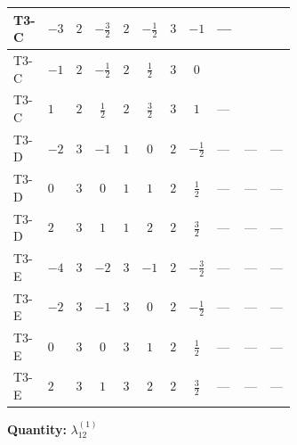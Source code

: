 \documentclass[8pt]{article}
\begin{document}
\begin{landscape}
\begin{longtable}{@{}llcccccc >{\raggedright\arraybackslash}p{0.21\linewidth} >{\raggedright\arraybackslash}p{0.21\linewidth} >{\raggedright\arraybackslash}p{0.21\linewidth}@{}}
T3-C & $-3$ & $2$ & $-\frac{3}{2}$ & $2$ & $-\frac{1}{2}$ & $3$ & $-1$ & --- & \scriptsize\adjustbox{max width=\linewidth}{$\begin{gathered} {\lambda_{12}^{(1)}} (3 T_{\nu}^{(1)}+3 T_{\nu}^{(2)})\end{gathered}$} & \scriptsize\adjustbox{max width=\linewidth}{$\begin{gathered} -\frac{9}{2} \operatorname{Tr}\!\left({y_1}\,\left({y_1}\right)^{\dagger}\,{y_2}\,\left({y_2}\right)^{\dagger}\right)\end{gathered}$} \\
\midrule
T3-C & $-1$ & $2$ & $-\frac{1}{2}$ & $2$ & $\frac{1}{2}$ & $3$ & $0$ & \scriptsize\adjustbox{max width=\linewidth}{$\begin{gathered} +24 {\lambda_{9}} \left({\lambda_{9}}\right)^{*}\end{gathered}$} & \scriptsize\adjustbox{max width=\linewidth}{$\begin{gathered} {\lambda_{12}^{(1)}} (3 T_{\nu}^{(1)}+3 T_{\nu}^{(2)})\end{gathered}$} & \scriptsize\adjustbox{max width=\linewidth}{$\begin{gathered} -\frac{9}{2} \operatorname{Tr}\!\left({y_1}\,\left({y_1}\right)^{\dagger}\,{y_2}\,\left({y_2}\right)^{\dagger}\right)\end{gathered}$} \\
\midrule
T3-C & $1$ & $2$ & $\frac{1}{2}$ & $2$ & $\frac{3}{2}$ & $3$ & $1$ & --- & \scriptsize\adjustbox{max width=\linewidth}{$\begin{gathered} {\lambda_{12}^{(1)}} (3 T_{\nu}^{(1)}+3 T_{\nu}^{(2)})\end{gathered}$} & \scriptsize\adjustbox{max width=\linewidth}{$\begin{gathered} -\frac{9}{2} \operatorname{Tr}\!\left({y_1}\,\left({y_1}\right)^{\dagger}\,{y_2}\,\left({y_2}\right)^{\dagger}\right)\end{gathered}$} \\
\midrule
T3-D & $-2$ & $3$ & $-1$ & $1$ & $0$ & $2$ & $-\frac{1}{2}$ & --- & --- & --- \\
\midrule
T3-D & $0$ & $3$ & $0$ & $1$ & $1$ & $2$ & $\frac{1}{2}$ & --- & --- & --- \\
\midrule
T3-D & $2$ & $3$ & $1$ & $1$ & $2$ & $2$ & $\frac{3}{2}$ & --- & --- & --- \\
\midrule
T3-E & $-4$ & $3$ & $-2$ & $3$ & $-1$ & $2$ & $-\frac{3}{2}$ & --- & --- & --- \\
\midrule
T3-E & $-2$ & $3$ & $-1$ & $3$ & $0$ & $2$ & $-\frac{1}{2}$ & --- & --- & --- \\
\midrule
T3-E & $0$ & $3$ & $0$ & $3$ & $1$ & $2$ & $\frac{1}{2}$ & --- & --- & --- \\
\midrule
T3-E & $2$ & $3$ & $1$ & $3$ & $2$ & $2$ & $\frac{3}{2}$ & --- & --- & --- \\
\midrule
\bottomrule
\end{longtable}
\clearpage
\noindent\textbf{Quantity: }$\lambda_{12}^{(1)}$\par\smallskip

\end{landscape}
\end{document}
